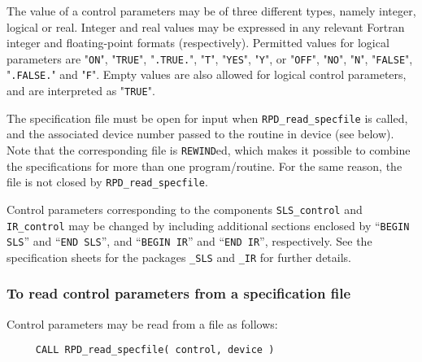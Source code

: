 \documentclass{galahad}
\newcommand{\packagename}{RPD}
\begin{document}
The value of a control parameters may be of three different types, namely
integer, logical or real.
Integer and real values may be expressed in any relevant Fortran integer and
floating-point formats (respectively). Permitted values for logical
parameters are "{\tt ON}", "{\tt TRUE}", "{\tt .TRUE.}", "{\tt T}",
"{\tt YES}", "{\tt Y}", or "{\tt OFF}", "{\tt NO}",
"{\tt N}", "{\tt FALSE}", "{\tt .FALSE.}" and "{\tt F}".
Empty values are also allowed for
logical control parameters, and are interpreted as "{\tt TRUE}".

The specification file must be open for
input when {\tt \packagename\_read\_specfile}
is called, and the associated device number
passed to the routine in device (see below).
Note that the corresponding
file is {\tt REWIND}ed, which makes it possible to combine the specifications
for more than one program/routine.  For the same reason, the file is not
closed by {\tt \packagename\_read\_specfile}.

Control parameters corresponding to the components
{\tt SLS\_control}
and
{\tt IR\_control} may be changed by including additional sections enclosed by
``{\tt BEGIN SLS}'' and
``{\tt END SLS}'', and
``{\tt BEGIN IR}'' and
``{\tt END IR}'', respectively.
See the specification sheets for the packages
{\tt \libraryname\_SLS}
and
{\tt \libraryname\_IR}
for further details.

\subsubsection{To read control parameters from a specification file}
\label{readspec}

Control parameters may be read from a file as follows:
\hskip0.5in
\def\baselinestretch{0.8} {\tt \begin{verbatim}
     CALL RPD_read_specfile( control, device )
\end{verbatim}}
\def\baselinestretch{1.0}
\end{document}
